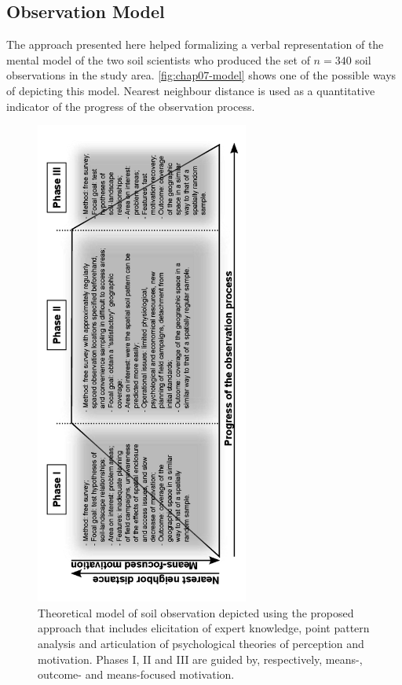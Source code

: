 \subsection{Observation Model}

The approach presented here helped formalizing a verbal representation of the mental model of the two soil 
scientists who produced the set of $n = 340$ soil observations in the study area. \autoref{fig:chap07-model} 
shows one of the possible ways of depicting this model. Nearest neighbour distance is 
used as a quantitative indicator of the progress of the observation process.

\begin{figure}[!h]
 \centering
 \includegraphics[width=7cm,angle=-90]{fig/chap07-observation-model}

 \caption{Theoretical model of soil observation depicted using the proposed approach that includes elicitation 
 of expert knowledge, point pattern analysis and articulation of psychological theories of perception and 
 motivation. Phases I, II and III are guided by, respectively, means-, outcome- and means-focused motivation.}
 \label{fig:chap07-model}
\end{figure}

